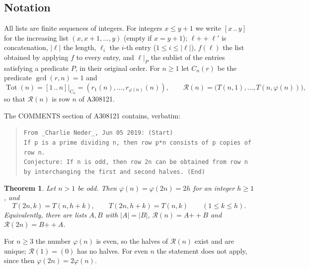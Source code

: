 \documentclass[11pt]{amsart}
\theoremstyle{plain}
\newtheorem{theorem}{Theorem}
\theoremstyle{definition}
\newcommand{\Tot}{\operatorname{Tot}}
\newcommand{\R}{\mathcal{R}}
\newcommand{\cat}{\mathbin{+\!\!+}}
\newcommand{\iv}[2]{[#1\,..\,#2]}
\begin{document}
\subsection*{Notation}
All lists are finite sequences of integers. For integers $x\le y+1$ we write $\iv{x}{y}$ for the increasing list $(x,x+1,\dots,y)$ (empty if $x=y+1$); $\ell\cat\ell'$ is concatenation, $|\ell|$ the length, $\ell_i$ the $i$-th entry ($1\le i\le|\ell|$), $f(\ell)$ the list obtained by applying $f$ to every entry, and $\ell|_P$ the sublist of the entries satisfying a predicate $P$, in their original order.
For $n\ge1$ let $C_n(r)$ be the predicate $\gcd(r,n)=1$ and
\[
  \Tot(n)=\iv{1}{n}|_{C_n}=(r_1(n),\dots,r_{\varphi(n)}(n)),\qquad
  \R(n)=\bigl(T(n,1),\dots,T(n,\varphi(n))\bigr),
\]
so that $\R(n)$ is row $n$ of A308121.

The COMMENTS section of A308121 \cite{A308121} contains, verbatim:
\begin{quote}
{\small\texttt{From \_Charlie Neder\_, Jun 05 2019: (Start)\\
If p is a prime dividing n, then row p*n consists of p copies of row n.\\
Conjecture: If n is odd, then row 2n can be obtained from row n by interchanging the first and second halves. (End)}}
\end{quote}

\begin{theorem}\label{thm:main}
Let $n>1$ be odd. Then $\varphi(n)=\varphi(2n)=2h$ for an integer $h\ge1$, and
\[
  T(2n,k)=T(n,h+k),\qquad T(2n,h+k)=T(n,k)\qquad(1\le k\le h).
\]
Equivalently, there are lists $A,B$ with $|A|=|B|$, $\R(n)=A\cat B$ and $\R(2n)=B\cat A$.
\end{theorem}

For $n\ge3$ the number $\varphi(n)$ is even, so the halves of $\R(n)$ exist and are unique; $\R(1)=(0)$ has no halves.
For even $n$ the statement does not apply, since then $\varphi(2n)=2\varphi(n)$.
\end{document}
